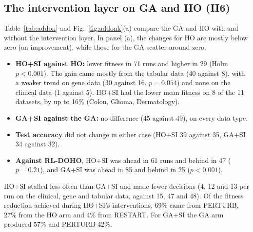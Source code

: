 \documentclass[pdflatex,sn-basic]{sn-jnl}
\begin{document}
\subsection{The intervention layer on GA and HO (H6)}\label{sec:addon}
Table~\ref{tab:addon} and Fig.~\ref{fig:addonk}(a) compare the GA and HO with and without the intervention layer. In panel (a), the changes for HO are mostly below zero (an improvement), while those for the GA scatter around zero.
\begin{itemize}
\item \textbf{HO+SI against HO:} lower fitness in 71 runs and higher in 29 (Holm $p<0.001$). The gain came mostly from the tabular data (40 against 8), with a weaker trend on gene data (30 against 16, $p=0.054$) and none on the clinical data (1 against 5). HO+SI had the lower mean fitness on 8 of the 11 datasets, by up to 16\% (Colon, Glioma, Dermatology).
\item \textbf{GA+SI against the GA:} no difference (45 against 49), on every data type.
\item \textbf{Test accuracy} did not change in either case (HO+SI 39 against 35, GA+SI 34 against 32).
\item \textbf{Against RL-DOHO}, HO+SI was ahead in 61 runs and behind in 47 ($p=0.21$), and GA+SI was ahead in 85 and behind in 25 ($p<0.001$).
\end{itemize}
HO+SI stalled less often than GA+SI and made fewer decisions (4, 12 and 13 per run on the clinical, gene and tabular data, against 15, 47 and 48). Of the fitness reduction achieved during HO+SI's interventions, 69\% came from PERTURB, 27\% from the HO arm and 4\% from RESTART. For GA+SI the GA arm produced 57\% and PERTURB 42\%.
\end{document}
